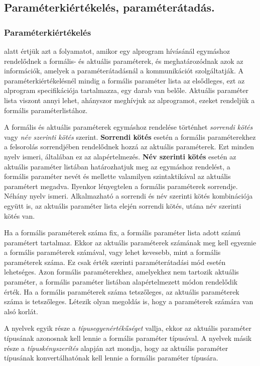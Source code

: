 \subsection{Paraméterkiértékelés, paraméterátadás.}

\subsubsection{Paraméterkiértékelés}
alatt értjük azt a folyamatot, amikor egy alprogram hívásánál egymáshoz
rendelődnek a formális- és aktuális paraméterek, és meghatározódnak azok az információk, amelyek a paraméterátadásnál a kommunikációt szolgáltatják. A paraméterkiértékelésnél mindig a formális paraméter lista az elsődleges, ezt az alprogram specifikációja tartalmazza, egy darab van belőle. Aktuális paraméter lista viszont annyi lehet, ahányszor meghívjuk az alprogramot, ezeket rendeljük a formális paraméterlistához.

A formális és aktuális paraméterek egymáshoz rendelése történhet \emph{sorrendi kötés} vagy \emph{név szerinti kötés} szerint. \textbf{Sorrendi kötés} esetén a formális paraméterekhez a felsorolás sorrendjében rendelődnek hozzá az aktuális paraméterek. Ezt minden nyelv ismeri, általában ez az alapértelmezés. \textbf{Név szerinti kötés} esetén az aktuális paraméter listában határozhatjuk meg az egymáshoz rendelést, a formális paraméter nevét és mellette valamilyen szintaktikával az aktuális paramétert megadva. Ilyenkor lényegtelen a formális paraméterek sorrendje. Néhány nyelv ismeri. Alkalmazható a sorrendi és név szerinti kötés kombinációja együtt is, az aktuális paraméter lista elején sorrendi kötés, utána név szerinti kötés van.

Ha a formális paraméterek száma fix, a formális paraméter lista adott számú paramétert tartalmaz. Ekkor az aktuális paraméterek számának meg kell egyeznie a formális paraméterek számával, vagy lehet kevesebb, mint a formális paraméterek száma. Ez csak érték szerinti paraméterátadási mód esetén lehetséges. Azon formális paraméterekhez, amelyekhez nem tartozik aktuális paraméter, a formális paraméter listában alapértelmezett módon rendelődik érték. Ha a formális paraméterek száma tetszőleges, az aktuális paraméterek száma is tetszőleges. Létezik olyan megoldás is, hogy a paraméterek számára van alsó korlát.

A nyelvek egyik része a \emph{típusegyenértékűséget} vallja, ekkor az aktuális paraméter típusának azonosnak kell lennie a formális paraméter típusával. A nyelvek másik része a \emph{típuskényszerítés} alapján azt mondja, hogy az aktuális paraméter típusának konvertálhatónak kell lennie a formális paraméter típusára.

